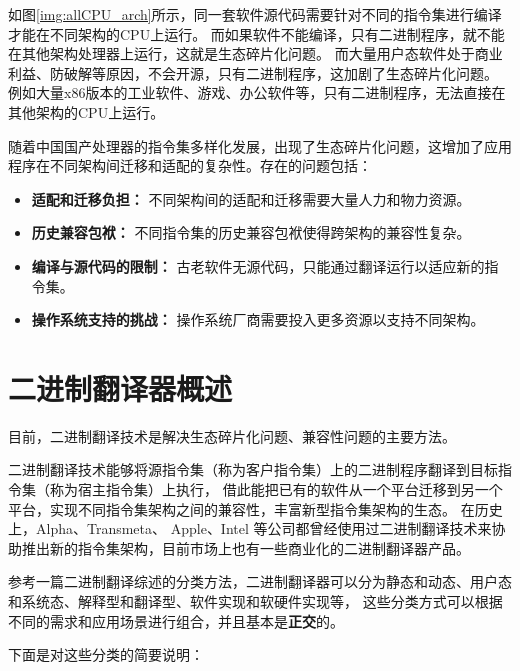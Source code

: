 如图\ref{img:allCPU_arch}所示，同一套软件源代码需要针对不同的指令集进行编译才能在不同架构的CPU上运行\footnotemark。
而如果软件不能编译，只有二进制程序，就不能在其他架构处理器上运行，这就是生态碎片化问题。
而大量用户态软件处于商业利益、防破解等原因，不会开源，只有二进制程序，这加剧了生态碎片化问题。
例如大量x86版本的工业软件、游戏、办公软件等，只有二进制程序，无法直接在其他架构的CPU上运行。


随着中国国产处理器的指令集多样化发展，出现了生态碎片化问题，这增加了应用程序在不同架构间迁移和适配的复杂性。存在的问题包括：
    \begin{itemize}
    \item \textbf{适配和迁移负担：} 不同架构间的适配和迁移需要大量人力和物力资源。
    
    \item \textbf{历史兼容包袱：} 不同指令集的历史兼容包袱使得跨架构的兼容性复杂。
    
    \item \textbf{编译与源代码的限制：} 古老软件无源代码，只能通过翻译运行以适应新的指令集。
    
    \item \textbf{操作系统支持的挑战：} 操作系统厂商需要投入更多资源以支持不同架构。
    \end{itemize}

\section{二进制翻译器概述}
目前，二进制翻译技术是解决生态碎片化问题、兼容性问题的主要方法。

二进制翻译技术能够将源指令集（称为客户指令集）上的二进制程序翻译到目标指令集（称为宿主指令集）上执行，
借此能把已有的软件从一个平台迁移到另一个平台，实现不同指令集架构之间的兼容性，丰富新型指令集架构的生态。
在历史上，Alpha\cite{chernoffFX32Profiledirected1998}、Transmeta\cite{dehnertTransmetaCodeMorphing2003}、
Apple\cite{RunningIntelBinaries}、Intel\cite{noauthor_intel_nodate}
等公司都曾经使用过二进制翻译技术来协助推出新的指令集架构，目前市场上也有一些商业化的二进制翻译器产品。

参考一篇二进制翻译综述的分类方法\cite{BT_review}，二进制翻译器可以分为静态和动态、用户态和系统态、解释型和翻译型、软件实现和软硬件实现等，
这些分类方式可以根据不同的需求和应用场景进行组合，并且基本是\textbf{正交}的。

下面是对这些分类的简要说明：

